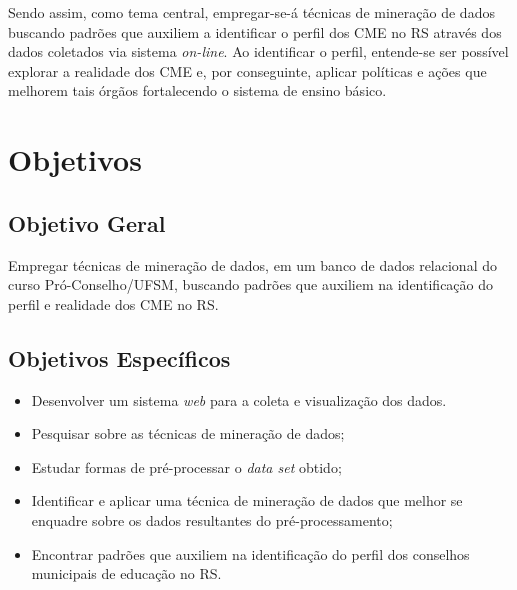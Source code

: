 \documentclass[projtg]{mdtufsm}
\begin{document}
Sendo assim, como tema central, empregar-se-á técnicas de mineração de dados buscando padrões que auxiliem a identificar o perfil dos CME no RS através dos dados coletados via sistema {\it on-line}. Ao identificar o perfil, entende-se ser possível explorar a realidade dos CME e, por conseguinte, aplicar políticas e ações que melhorem tais órgãos fortalecendo o sistema de ensino básico.



\chapter{Objetivos}
\section{Objetivo Geral}

Empregar técnicas de mineração de dados, em um banco de dados relacional do curso Pró-Conselho/UFSM, buscando padrões que auxiliem na identificação do perfil e realidade dos CME no RS.
	
\section{Objetivos Específicos}
\begin{itemize}
  \item Desenvolver um sistema {\it web} para a coleta e visualização dos dados.
  \item Pesquisar sobre as técnicas de mineração de dados;
  \item Estudar formas de pré-processar o \textit{data set} obtido;
  \item Identificar e aplicar uma técnica de mineração de dados que melhor se enquadre sobre os dados resultantes do pré-processamento;
  \item Encontrar padrões que auxiliem na identificação do perfil dos conselhos municipais de educação no RS.
\end{itemize}
\end{document}
